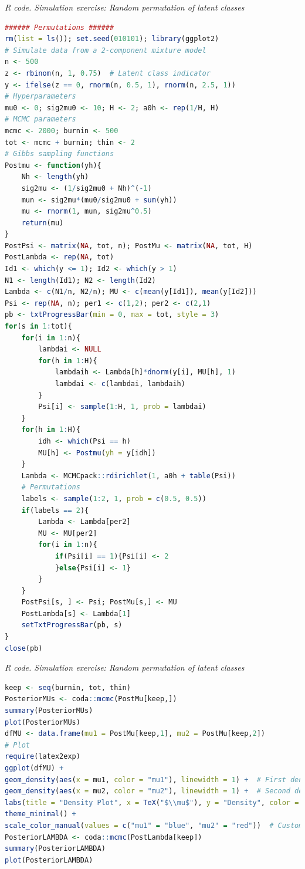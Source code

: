 \begin{tcolorbox}[enhanced,width=4.67in,center upper,
	fontupper=\large\bfseries,drop shadow southwest,sharp corners]
	\textit{R code. Simulation exercise: Random permutation of latent classes}
	\begin{VF}
		\begin{lstlisting}[language=R]
###### Permutations ######
rm(list = ls()); set.seed(010101); library(ggplot2)
# Simulate data from a 2-component mixture model
n <- 500
z <- rbinom(n, 1, 0.75)  # Latent class indicator
y <- ifelse(z == 0, rnorm(n, 0.5, 1), rnorm(n, 2.5, 1))
# Hyperparameters
mu0 <- 0; sig2mu0 <- 10; H <- 2; a0h <- rep(1/H, H)
# MCMC parameters
mcmc <- 2000; burnin <- 500
tot <- mcmc + burnin; thin <- 2
# Gibbs sampling functions
Postmu <- function(yh){
	Nh <- length(yh)
	sig2mu <- (1/sig2mu0 + Nh)^(-1)
	mun <- sig2mu*(mu0/sig2mu0 + sum(yh))
	mu <- rnorm(1, mun, sig2mu^0.5)
	return(mu)
}
PostPsi <- matrix(NA, tot, n); PostMu <- matrix(NA, tot, H)
PostLambda <- rep(NA, tot)
Id1 <- which(y <= 1); Id2 <- which(y > 1)
N1 <- length(Id1); N2 <- length(Id2)
Lambda <- c(N1/n, N2/n); MU <- c(mean(y[Id1]), mean(y[Id2]))
Psi <- rep(NA, n); per1 <- c(1,2); per2 <- c(2,1)
pb <- txtProgressBar(min = 0, max = tot, style = 3)
for(s in 1:tot){
	for(i in 1:n){
		lambdai <- NULL
		for(h in 1:H){
			lambdaih <- Lambda[h]*dnorm(y[i], MU[h], 1)
			lambdai <- c(lambdai, lambdaih)
		}
		Psi[i] <- sample(1:H, 1, prob = lambdai)
	}
	for(h in 1:H){
		idh <- which(Psi == h)
		MU[h] <- Postmu(yh = y[idh])
	}
	Lambda <- MCMCpack::rdirichlet(1, a0h + table(Psi))
	# Permutations
	labels <- sample(1:2, 1, prob = c(0.5, 0.5))
	if(labels == 2){
		Lambda <- Lambda[per2]
		MU <- MU[per2]
		for(i in 1:n){
			if(Psi[i] == 1){Psi[i] <- 2
			}else{Psi[i] <- 1}
		}
	}
	PostPsi[s, ] <- Psi; PostMu[s,] <- MU
	PostLambda[s] <- Lambda[1]
	setTxtProgressBar(pb, s)
}
close(pb)\end{lstlisting}
	\end{VF}
\end{tcolorbox}

\begin{tcolorbox}[enhanced,width=4.67in,center upper,
	fontupper=\large\bfseries,drop shadow southwest,sharp corners]
	\textit{R code. Simulation exercise: Random permutation of latent classes}
	\begin{VF}
		\begin{lstlisting}[language=R]
keep <- seq(burnin, tot, thin)
PosteriorMUs <- coda::mcmc(PostMu[keep,])
summary(PosteriorMUs)
plot(PosteriorMUs)
dfMU <- data.frame(mu1 = PostMu[keep,1], mu2 = PostMu[keep,2])
# Plot
require(latex2exp)
ggplot(dfMU) +
geom_density(aes(x = mu1, color = "mu1"), linewidth = 1) +  # First density plot
geom_density(aes(x = mu2, color = "mu2"), linewidth = 1) +  # Second density plot
labs(title = "Density Plot", x = TeX("$\\mu$"), y = "Density", color = "Variable") +
theme_minimal() +
scale_color_manual(values = c("mu1" = "blue", "mu2" = "red"))  # Custom colors
PosteriorLAMBDA <- coda::mcmc(PostLambda[keep])
summary(PosteriorLAMBDA)
plot(PosteriorLAMBDA)
		\end{lstlisting}
	\end{VF}
\end{tcolorbox}

